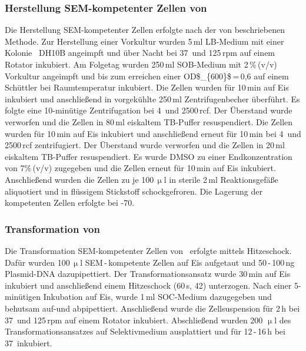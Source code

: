 \subsubsection{Herstellung \acs{SEM}-kompetenter Zellen von \Ecoli }
Die Herstellung \acs{SEM}-kompetenter Zellen erfolgte nach der von \citet{Inoue.1990} beschriebenen Methode.
Zur Herstellung einer Vorkultur wurden 5\,ml LB-Medium mit einer Kolonie \Ecoli\ DH10B angeimpft und über Nacht bei 37\celcius\ und 125\,\acs{rpm} auf einem Rotator inkubiert. Am Folgetag wurden 250\,ml SOB-Medium mit 2\,\%\,(v/v) Vorkultur angeimpft und bis zum erreichen einer \acs{OD$_{600}$}\,=\,0,6 auf einem Schüttler bei Raumtemperatur inkubiert. Die Zellen wurden für 10\,min auf Eis inkubiert und anschließend in vorgekühlte 250\,ml Zentrifugenbecher überführt. Es folgte eine 10-minütige Zentrifugation bei 4\celcius\ und 2500\,\acs{rcf}. Der Überstand wurde verworfen und die Zellen in 80\,ml eiskaltem TB-Puffer resuspendiert. Die Zellen wurden für 10\,min auf Eis inkubiert und anschließend erneut für 10\,min bei 4\celcius\ und 2500\,\acs{rcf} zentrifugiert. Der Überstand wurde verworfen und die Zellen in 20\,ml eiskaltem TB-Puffer resuspendiert. Es wurde \acs{DMSO} zu einer Endkonzentration von 7\%\,(v/v) zugegeben und die Zellen erneut für 10\,min auf Eis inkubiert. Anschließend wurden die Zellen zu je 100\,$\upmu$l in sterile 2\,ml Reaktionsgefäße aliquotiert und in flüssigem Stickstoff schockgefroren. Die Lagerung der kompetenten Zellen erfolgte bei -70\celcius.      
\subsubsection{Transformation von \Ecoli}
Die Transformation SEM-kompetenter Zellen von \Ecoli\ erfolgte mittels Hitzeschock.
Dafür wurden 100\,$\upmu$l SEM\,-\,kompetente Zellen auf Eis aufgetaut und 50\,-\,100\,ng Plasmid-DNA dazupipettiert. Der Transformationsansatz wurde 30\,min auf Eis inkubiert und anschließend einem Hitzeschock (60\,s, 42\celcius) unterzogen. Nach einer 5-minütigen Inkubation auf Eis, wurde 1\,ml SOC-Medium dazugegeben und behutsam auf-und abpipettiert. Anschließend wurde die Zellsuspension für 2\,h bei 37\celcius\ und 125\,rpm auf einem Rotator inkubiert. Abschließend wurden 200\,\,$\upmu$l des Transformationsansatzes auf Selektivmedium ausplattiert und für 12\,-\,16\,h bei 37\celcius\ inkubiert. 

